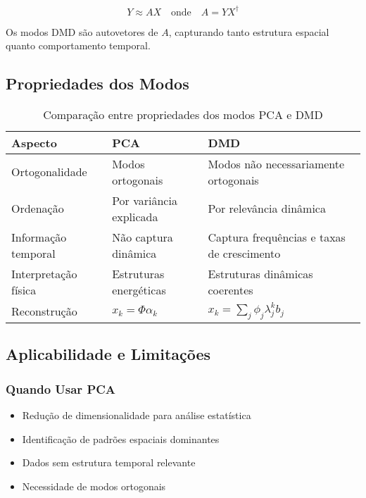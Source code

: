 \documentclass[a4,11pt]{pssbmac}
\begin{document}
\begin{equation}
Y \approx AX \quad \text{onde} \quad A = Y X^{\dagger}
\end{equation}

Os modos DMD são autovetores de $A$, capturando tanto estrutura espacial quanto comportamento temporal.

\subsection{Propriedades dos Modos}

\begin{table}[h]
\centering
\begin{tabular}{|l|l|l|}
\hline
\textbf{Aspecto} & \textbf{PCA} & \textbf{DMD} \\
\hline
Ortogonalidade & Modos ortogonais & Modos não necessariamente ortogonais \\
\hline
Ordenação & Por variância explicada & Por relevância dinâmica \\
\hline
Informação temporal & Não captura dinâmica & Captura frequências e taxas de crescimento \\
\hline
Interpretação física & Estruturas energéticas & Estruturas dinâmicas coerentes \\
\hline
Reconstrução & $x_k = \Phi\alpha_k$ & $x_k = \sum_j \phi_j \lambda_j^k b_j$ \\
\hline
\end{tabular}
\caption{Comparação entre propriedades dos modos PCA e DMD}
\end{table}

\subsection{Aplicabilidade e Limitações}

\subsubsection{Quando Usar PCA}
\begin{itemize}
\item Redução de dimensionalidade para análise estatística
\item Identificação de padrões espaciais dominantes
\item Dados sem estrutura temporal relevante
\item Necessidade de modos ortogonais
\end{itemize}
\end{document}
